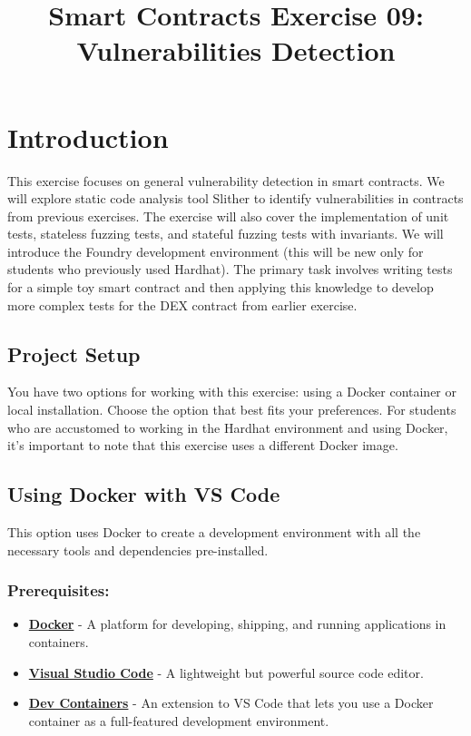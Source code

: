 \documentclass[12pt]{article}
\title{Smart Contracts Exercise 09: \\ Vulnerabilities Detection}
\author{}
\date{}
\begin{document}
\maketitle
\section{Introduction}

This exercise focuses on general vulnerability detection in smart contracts. We
will explore static code analysis tool Slither to identify vulnerabilities in
contracts from previous exercises. The exercise will also cover the
implementation of unit tests, stateless fuzzing tests, and stateful fuzzing
tests with invariants. We will introduce the Foundry development environment
(this will be new only for students who previously used Hardhat). The primary
task involves writing tests for a simple toy smart contract and then applying
this knowledge to develop more complex tests for the DEX contract from earlier
exercise.

\subsection*{Project Setup}

You have two options for working with this exercise: using a Docker container
or local installation. Choose the option that best fits your preferences. For
students who are accustomed to working in the Hardhat environment and using
Docker, it's important to note that this exercise uses a different Docker
image.

\subsection{Using Docker with VS Code}

This option uses Docker to create a development environment with all the
necessary tools and dependencies pre-installed.

\subsubsection*{Prerequisites:}

\begin{itemize}
    \item \textbf{\href{https://www.docker.com/products/docker-desktop}{Docker}} - A platform for developing, shipping, and running applications in containers.
    \item \textbf{\href{https://code.visualstudio.com/}{Visual Studio Code}} - A lightweight but powerful source code editor.
    \item \textbf{\href{https://marketplace.visualstudio.com/items?itemName=ms-vscode-remote.remote-containers}{Dev Containers}} - An extension to VS Code that lets you use a Docker container as a full-featured development environment.
\end{itemize}
\end{document}
